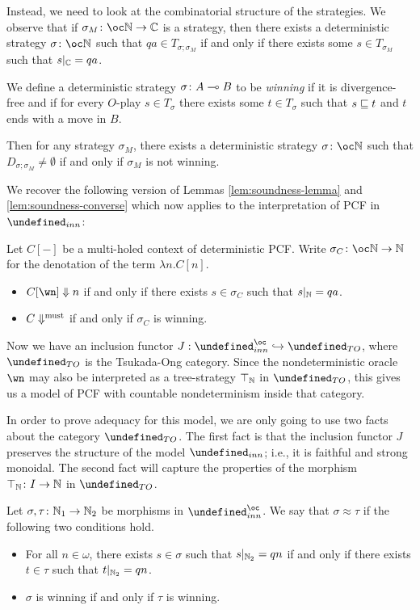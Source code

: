 \documentclass[sigplan,9pt,review]{acmart}\settopmatter{printfolios=true,printccs=false,printacmref=false}
\let\G\undefined
\begin{document}
Instead, we need to look at the combinatorial structure of the strategies.  
We observe that if $\sigma_M\from\oc\bN\to\bC$ is a strategy, then there exists a deterministic strategy $\sigma\from\oc\bN$ such that $qa\in T_{\sigma;\sigma_M}$ if and only if there exists some $s\in T_{\sigma_M}$ such that $s\vert_{\mathbb{C}}=qa$.  

We define a deterministic strategy $\sigma\colon A \multimap B$ to be \emph{winning} if it is divergence-free and if for every $O$-play $s\in T_\sigma$ there exists some $t\in T_\sigma$ such that $s\sqsubseteq t$ and $t$ ends with a move in $B$.  

Then for any strategy $\sigma_M$, there exists a deterministic strategy $\sigma\from\oc\bN$ such that $D_{\sigma;\sigma_M}\ne\emptyset$ if and only if $\sigma_M$ is not winning.

We recover the following version of Lemmas \ref{lem:soundness-lemma} and \ref{lem:soundness-converse} which now applies to the interpretation of PCF in $\G_{inn}$:
\begin{lemma}
  Let $C[-]$ be a multi-holed context of deterministic PCF.
  Write $\sigma_C\from\oc\bN\to\bN$ for the denotation of the term $\lambda n.C[n]$.  
  \begin{itemize}
    \item $C[\wn]\converges n$ if and only if there exists $s\in \sigma_C$ such that $s\vert_{\mathbb{N}}=qa$.  
    \item $C\Downarrow^{\text{must}}$ if and only if $\sigma_C$ is winning.
  \end{itemize}
  \label{lem:pcf-soundness-lemma}
\end{lemma}

Now we have an inclusion functor $J:\G_{inn}^\oc\hookrightarrow\G_{TO}$, where $\G_{TO}$ is the Tsukada-Ong category.  
Since the nondeterministic oracle $\wn$ may also be interpreted as a tree-strategy $\top_{\mathbb{N}}$ in $\G_{TO}$, this gives us a model of PCF with countable nondeterminism inside that category.  

In order to prove adequacy for this model, we are only going to use two facts about the category $\G_{TO}$.  
The first fact is that the inclusion functor $J$ preserves the structure of the model $\G_{inn}$; i.e., it is faithful and strong monoidal.  
The second fact will capture the properties of the morphism $\top_{\mathbb{N}}\colon I \to \mathbb{N}$ in $\G_{TO}$.  

\begin{definition}
  Let $\sigma,\tau\colon\mathbb{N}_1\to\mathbb{N}_2$ be morphisms in $\G_{inn}^\oc$.  
  We say that $\sigma\approx\tau$ if the following two conditions hold.
  \begin{itemize}
    \item For all $n\in\omega$, there exists $s\in\sigma$ such that $s\vert_{\mathbb{N}_2}=qn$ if and only if there exists $t\in\tau$ such that $t\vert_{\mathbb{N}_2}=qn$.  
    \item $\sigma$ is winning if and only if $\tau$ is winning.
  \end{itemize}
\end{definition}
\end{document}
